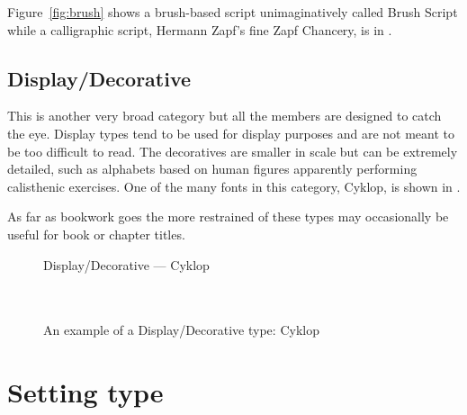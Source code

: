 \documentclass[10pt,letterpaper,extrafontsizes]{memoir}
\newcommand{\PWnote}[2]{}
\begin{document}
    Figure~\ref{fig:brush} shows a brush-based script 
unimaginatively called 
Brush Script while a
calligraphic script, Hermann Zapf's fine
Zapf Chancery,
is in .

\subsection{Display/Decorative}

    This is another very broad category 
but all the members are designed
to catch the eye. Display types tend to be used for display purposes and
are not meant to be too difficult to read. The decoratives are smaller in scale
but can be extremely detailed, such as alphabets based on human figures 
apparently performing calisthenic exercises. One of the many fonts
in this category, Cyklop, is shown in 
.

    As far as bookwork goes the more restrained of these types may occasionally
be useful for book or chapter titles.

\begin{figure}
\centering
{\centering{}\selectfont
  Display/Decorative --- Cyklop \\
  \UCalphabet \\
  \LCalphabet \\
  \fox\par}
\caption{An example of a Display/Decorative type: Cyklop} 
   \label{fig:cyklop}
\end{figure}

\section{Setting type}

\PWnote{2009/04/03}{Added bits and pieces about letterpress.}
\end{document}
